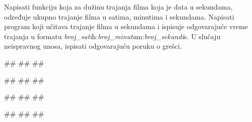 \begin{Exercise}[label=POK_05] 
Napisati funkciju koja za dužinu trajanja filma koja je data u sekundama, 
određuje ukupno trajanje filma u satima, minutima i sekundama. 
Napisati program koji učitava trajanje filma u sekundama i ispisuje odgovarajuće
vreme trajanja u formatu \textit{broj\_sati}h:\textit{broj\_minuta}m:\textit{broj\_sekundi}s.
U slučaju neispravnog unosa, ispisati odgovarajuću poruku o grešci. 

\begin{miditest}
\begin{upotreba}{1}
#\naslovInt#
##
##
\end{upotreba}
\end{miditest}
\begin{miditest}
\begin{upotreba}{2}
#\naslovInt#
##
##
\end{upotreba}
\end{miditest}

\begin{miditest}
\begin{upotreba}{3}
#\naslovInt#
##
##
\end{upotreba}
\end{miditest}
\begin{miditest}
\begin{upotreba}{4}
#\naslovInt#
##
##
\end{upotreba}
\end{miditest}

\end{Exercise}
\ifresenja
\begin{Answer}[ref=POK_05]
\end{Answer}
\fi


